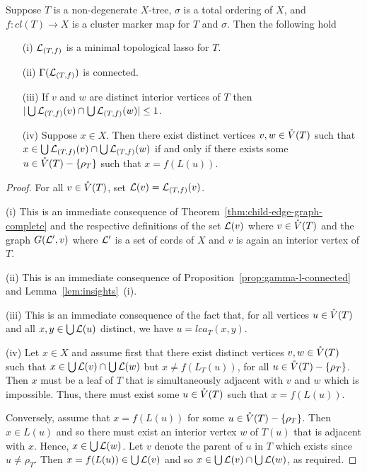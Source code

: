 \begin{lem}
  \label{lem:insights}
  Suppose $T$ is a non-degenerate $X$-tree, $\sigma$ is a total ordering of
  $X$, and $f:cl(T)\to X$ is a cluster marker map for $T$ and $\sigma$. Then
  the following hold
  \begin{enumerate}
  \item[(i)] ${\mathcal L}_{(T,f)}$ is a minimal topological lasso for $T$.
  \item[(ii)] $\Gamma({\mathcal L}_{(T,f)})$ is connected.
  \item[(iii)] If $v$ and $w$ are distinct interior vertices of $T$ then
    $|\bigcup {\mathcal L}_{(T,f)}(v)\cap \bigcup {\mathcal L}_{(T,f)}(w)|\leq 1$.
  \item[(iv)] Suppose $x\in X$. Then there exist distinct vertices $v,w\in
    \mathring{V}(T)$ such that $x\in \bigcup {\mathcal L}_{(T,f)}(v)\cap \bigcup {\mathcal L}_{(T,f)}(w)$
    if and only if there exists some $u\in \mathring{V}(T)-\{\rho_T\}$ such that
    $x=f(L(u))$.
  \end{enumerate}
\end{lem}
\begin{proof}
  For all $v\in \mathring{V}(T)$, set ${\mathcal L}(v)={\mathcal L}_{(T,f)}(v)$.

  (i) This is an immediate consequence of
  Theorem~\ref{thm:child-edge-graph-complete} and the respective definitions
  of the set ${\mathcal L}(v)$ where $v\in \mathring{V}(T)$ and the graph $G({\mathcal L}',v)$ where
  ${\mathcal L}'$ is a set of cords of $X$ and $v$ is again an interior vertex of $T$.
 

  (ii) This is an immediate consequence of
  Proposition~\ref{prop:gamma-l-connected} and Lemma~\ref{lem:insights}~(i).


  (iii) This is an immediate consequence of the fact that, for all vertices
  $u\in \mathring{V}(T)$ and all $x,y\in \bigcup{\mathcal L}(u)$ distinct, we have
  $u=lca_T(x,y)$.

  (iv) Let $x\in X$ and assume first that there exist distinct vertices
  $v,w\in \mathring{V}(T)$ such that $x\in \bigcup {\mathcal L}(v)\cap \bigcup {\mathcal L}(w)$ but
  $x\not =f(L_T(u))$, for all $u\in \mathring{V}(T)-\{\rho_T\}$. Then $x$ must be a
  leaf of $T$ that is simultaneously adjacent with $v$ and $w$ which is
  impossible. Thus, there must exist some $u\in \mathring{V}(T)$ such that $x=f(L(u))$.

  Conversely, assume that $x=f(L(u))$ for some $u\in \mathring{V}(T)-\{\rho_T\}$. Then
  $x\in L(u)$ and so there must exist an interior vertex $w$ of $T(u)$ that is
  adjacent with $x$.  Hence, $x\in\bigcup {\mathcal L}(w)$.  Let $v$ denote the parent
  of $u$ in $T$ which exists since $u\not=\rho_T$.  Then $x=f(L(u))\in \bigcup
  {\mathcal L}(v)$ and so $x\in \bigcup {\mathcal L}(v)\cap \bigcup {\mathcal L}(w)$, as required.
\end{proof}

